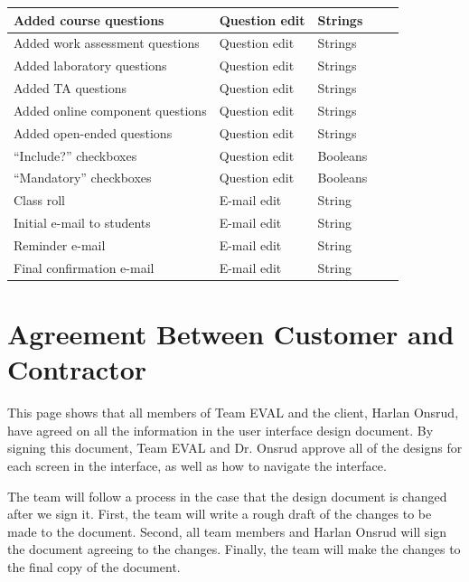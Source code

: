 \documentclass{article}
\begin{document}
\begin{center}
\begin{tabular}{|p{4.4cm}|p{2.2cm}|p{2cm}|p{4cm}|p{4cm}|}
\hline
Added course questions & Question edit & Strings & & \\ 
\hline
Added work assessment questions & Question edit & Strings & & \\ 
\hline
Added laboratory questions & Question edit & Strings & & \\ 
\hline
Added TA questions & Question edit & Strings & & \\ 
\hline
Added online component questions & Question edit & Strings & & \\ 
\hline
Added open-ended questions & Question edit & Strings & & \\ 
\hline
``Include?'' checkboxes & Question edit & Booleans & & \\ 
\hline
``Mandatory'' checkboxes & Question edit & Booleans & & \\ 
\hline
Class roll & E-mail edit & String & & \\ 
\hline
Initial e-mail to students & E-mail edit & String & & \\ 
\hline
Reminder e-mail & E-mail edit & String & & \\ 
\hline
Final confirmation e-mail & E-mail edit & String & & \\ 
\hline
\end{tabular}
\end{center}

\appendix
{}

\newpage
\section{Agreement Between Customer and Contractor}
This page shows that all members of Team EVAL and the client, Harlan Onsrud, have agreed on all the information in the user interface design document. By signing this document, Team EVAL and Dr. Onsrud approve all of the designs for each screen in the interface, as well as how to navigate the interface.

The team will follow a process in the case that the design document is changed after we sign it. First, the team will write a rough draft of the changes to be made to the document. Second, all team members and Harlan Onsrud will sign the document agreeing to the changes. Finally, the team will make the changes to the final copy of the document.
\end{document}
